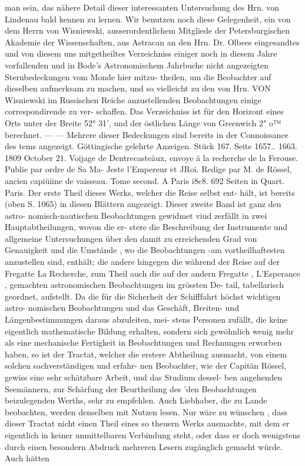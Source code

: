 \documentclass[12pt,a4paper]{article}
\begin{document}
man  sein,  das  nähere  Detail  dieser  interessanten  Untersuchung  des  Hrn.  von  Lindenau  bald  kennen  zu lernen. Wir  benutzen  noch  diese  Gelegenheit,  ein  von  dem  Herrn  von  Wisniewski,  ausserordentlichem Mitgliede  der  Petersburgischen  Akademie  der  Wissenschaften,  aus  Astracan  an  den  Hrn.  Dr.  Olbees eingesandtes  und  von  diesem  uns  mitgetheiltes  Verzeichniss  einiger  noch  in  diesem  Jahre  vorfallenden und  in  Bode's  Astronomischem  Jahrbuche  nicht  angezeigten  Sternbedeckungen  vom  Monde  hier  mitzu- theilen,  um  die  Beobachter  auf  dieselben  aufmerksam  zu  machen,  und  so  vielleicht  zu  den  von  Hrn. VON  Wisniewski  im  Russischen  Reiche  anzustellenden  Beobachtungen  einige  correspondirende  zu  ver- schaffen. Das  Verzeichniss  ist  für  den  Horizont  eines  Orts  unter  der  Breite  52°  31',  und  der  östlichen Länge  von  Greenwich  2"  o™  berechnet.  ---  --- Mehrere  dieser  Bedeckungen  sind  bereits  in  der  Connoissance  des  tems  angezeigt. Göttingische  gelehrte  Anzeigen.     Stück  167.     Seite  1657..  1663.     1809  October  21. Voijage  de  Dentrecasteäux,  envoye  ä  la  recherche  de  la  Ferouse.  Publie  par  ordre  de  Sa  Ma- Jeste  l'Empereur  et  JRoi.  Redige  par  M.  de  Rössel,  ancien  capiüiine  de  vaisseau.  Tome  second.  A Paris  i8c8.  692  Seiten  in  Quart.  Paris.  Der  erste  Theil  dieses  Werks,  welcher  die  Reise  selbst  ent- hält, ist  bereits  (oben  S.  1065)  in  diesen  Blättern  angezeigt.  Dieser  zweite  Band  ist  ganz  den  astro- nomisch-nautischen Beobachtungen  gewidmet  viud  zerfällt  in  zwei  Hauptabtheilungen,  wovon  die  er- stere  die  Beschreibung  der  Instrumente  und  allgemeine  Untersuchungen  über  den  damit  zu  erreichenden Grad  von  Genauigkeit  und  die  Umstände ,  wo  die  Beobachtungen  -am  vortheilhaftesten  anzustellen  sind, enthält;  die  andere  hingegen  die  während  der  Reise  auf  der  Fregatte  La  Recherche,  zum  Theil  auch die  auf  der  andern  Fregatte ,  L'Esperance ,  gemachten  astronomischen  Beobachtungen  im  grössten  De- tail, tabellarisch  geordnet,  aufstellt.  Da  die  für  die  Sicherheit  der  Schifffahrt  höchst  wichtigen  astro- nomischen Beobachtungen  und  das  Geschäft,  Breiten-  und  Längenbestimmungen  daraus  abzuleiten,  mei- stens Personen  zufällt,  die  keine  eigentlich  mathematische  Bildung  erhalten,  sondern  sich  gewöhnlich wenig  mehr  als  eine  mechanische  Fertigkeit  in  Beobachtungen  und  Rechnungen  erworben  haben,  so  ist der  Tractat,  welcher  die  erstere  Abtheilung  ausmacht,  von  einem  solchen  sachverständigen  und  erfahr- nen Beobachter,  wie  der  Capitän  Rössel,  gewiss  eine  sehr  schätzbare  Arbeit,  und  das  Studium  dessel- ben angehenden  Seemännern,  zur  Schärfung  der  Beurtheilung  des  'den  Beobachtungen  beizulegenden Werths,  sehr  zu  empfehlen.  Auch  Liebhaber,  die  zu  Lande  beobachten,  werden  denselben  mit  Nutzen lesen.  Nur  wäre  zu  wünschen ,  dass  dieser  Tractat  nicht  einen  Theil  eines  so  theuern  Werks  ausmachte, mit  dem  er  eigentlich  in  keiner  unmittelbaren  Verbindung  steht,  oder  dass  er  doch  wenigstens  durch einen  besondern  Abdruck  mehreren  Lesern  zugänglich  gemacht  würde.  Auch  hätten  
\end{document}

